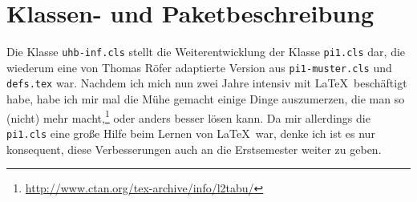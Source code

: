 \documentclass[nicefonts,nogruppe,nosemester,noveranstaltung,notutor,noabgabe,utf]{uhb-inf}
\begin{document}
\begin{figure}
	\setlength\fboxsep{0pt}
	\setlength\fboxrule{.01667em}
\end{figure}

\section{Klassen- und Paketbeschreibung}

Die Klasse \texttt{uhb-inf.cls} stellt die Weiterentwicklung der Klasse \texttt{pi1.cls} dar, die wiederum eine von Thomas Röfer adaptierte Version aus \texttt{pi1-muster.cls} und \texttt{defs.tex} war. Nachdem ich mich nun zwei Jahre intensiv mit \LaTeX\ beschäftigt habe, habe ich mir mal die Mühe gemacht einige Dinge auszumerzen, die man so (nicht) mehr macht,\footnote{\url{http://www.ctan.org/tex-archive/info/l2tabu/}} oder anders besser lösen kann. Da mir allerdings die \texttt{pi1.cls} eine große Hilfe beim Lernen von \LaTeX\ war, denke ich ist es nur konsequent, diese Verbesserungen auch an die Erstsemester weiter zu geben.
\end{document}
